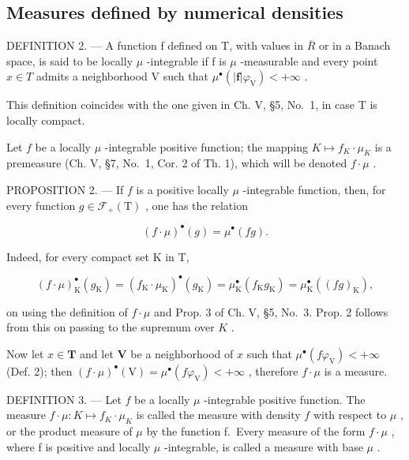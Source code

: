 \subsection{Measures defined by numerical densities}

DEFINITION 2. --- A function f defined on T, with values in \(\overline{R}\) or in a Banach space, is said to be locally \(\mu\) -integrable if f is \(\mu\) -measurable and every point \(x \in T\) admits a neighborhood V such that \(\mu^{\bullet}(|\mathbf{f}|\varphi_{\mathrm{V}}) < +\infty\) .

This definition coincides with the one given in Ch. V, §5, No.~1, in case T is locally compact.

Let \(f\) be a locally \(\mu\) -integrable positive function; the mapping \(K \mapsto f_K \cdot \mu_K\) is a premeasure (Ch. V, §7, No.~1, Cor. 2 of Th. 1), which will be denoted \(f \cdot \mu\) .

PROPOSITION 2. --- If \(f\) is a positive locally \(\mu\) -integrable function, then, for every function \(g \in \mathcal{F}_{+}(\mathrm{T})\) , one has the relation

\[
(f \cdot \mu) ^ {\bullet} (g) = \mu^ {\bullet} (f g).\tag{1}
\]

Indeed, for every compact set K in T,

\[
(f \cdot \mu) _ {\mathrm{K}} ^ {\bullet} (g _ {\mathrm{K}}) = (f _ {\mathrm{K}} \cdot \mu_ {\mathrm{K}}) ^ {\bullet} (g _ {\mathrm{K}}) = \mu_ {\mathrm{K}} ^ {\bullet} (f _ {\mathrm{K}} g _ {\mathrm{K}}) = \mu_ {\mathrm{K}} ^ {\bullet} ((f g) _ {\mathrm{K}}),
\]

on using the definition of \(f \cdot \mu\) and Prop. 3 of Ch. V, §5, No.~3. Prop. 2 follows from this on passing to the supremum over \(K\) .

Now let \(x \in \mathbf{T}\) and let \(\mathbf{V}\) be a neighborhood of \(x\) such that \(\mu^{\bullet}(f\varphi_{\mathrm{V}}) < +\infty\) (Def. 2); then \((f \cdot \mu)^{\bullet}(\mathrm{V}) = \mu^{\bullet}(f\varphi_{\mathrm{V}}) < +\infty\) , therefore \(f \cdot \mu\) is a measure.

DEFINITION 3. --- Let \(f\) be a locally \(\mu\) -integrable positive function. The measure \(f \cdot \mu : K \mapsto f_K \cdot \mu_K\) is called the measure with density \(f\) with respect to \(\mu\) , or the product measure of \(\mu\) by the function f.~Every measure of the form \(f \cdot \mu\) , where f is positive and locally \(\mu\) -integrable, is called a measure with base \(\mu\) .

